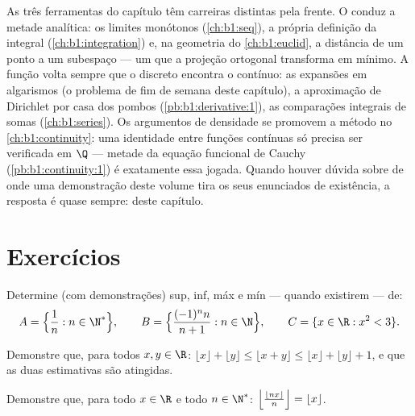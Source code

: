 \begin{remark}
As três ferramentas do capítulo têm carreiras distintas pela frente. O
 conduz a metade analítica: os limites monótonos
(\cref{ch:b1:seq}), a própria definição da integral
(\cref{ch:b1:integration}) e, na geometria do
\cref{ch:b1:euclid}, a distância de um ponto a um subespaço ---
um  que a projeção ortogonal transforma em mínimo. A
função  volta sempre que o discreto encontra o
contínuo: as expansões em algarismos (o problema de fim de semana deste
capítulo), a aproximação de Dirichlet por casa dos pombos
(\cref{pb:b1:derivative:1}), as comparações integrais de somas
(\cref{ch:b1:series}). Os argumentos de densidade se promovem a método
no \cref{ch:b1:continuity}: uma identidade entre funções contínuas
só precisa ser verificada em $\Q$ --- metade da equação funcional de
Cauchy (\cref{pb:b1:continuity:1}) é exatamente essa jogada. Quando
houver dúvida sobre de onde uma demonstração deste volume tira os seus
enunciados de existência, a resposta é quase sempre: deste capítulo.
\end{remark}

\section{Exercícios}

\begin{exercise}[$\star$]\label{exo:b1:reals:1}
Determine (com demonstrações) sup, inf, máx e mín --- quando existirem --- de:
\[
A = \Bigl\{\frac{1}{n} : n \in \N^*\Bigr\},
\qquad
B = \Bigl\{\frac{(-1)^n n}{n+1} : n \in \N\Bigr\},
\qquad
C = \{x \in \R : x^2 < 3\}.
\]
\end{exercise}

\begin{exercise}[$\star$]\label{exo:b1:reals:2}
Demonstre que, para todos $x, y \in \R$: $\lfloor x \rfloor + \lfloor y
\rfloor \leq \lfloor x + y \rfloor \leq \lfloor x \rfloor + \lfloor y
\rfloor + 1$, e que as duas estimativas são atingidas.
\end{exercise}

\begin{exercise}[$\star$]\label{exo:b1:reals:3}
Demonstre que, para todo $x \in \R$ e todo $n \in \N^*$:
$\Bigl\lfloor \frac{\lfloor nx \rfloor}{n} \Bigr\rfloor = \lfloor x
\rfloor$.
\end{exercise}

